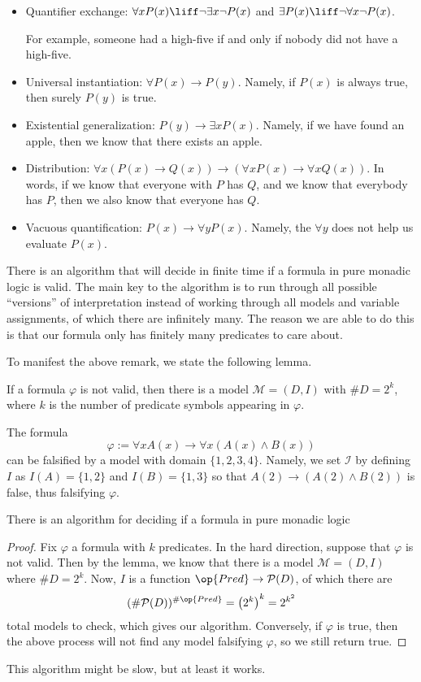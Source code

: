 \documentclass[../notes.tex]{subfiles}
\begin{document}
\begin{itemize}
	\item Quantifier exchange: $\forall xP(x)\liff\lnot\exists x\lnot P(x)$ and $\exists P(x)\liff\lnot\forall x\lnot P(x)$.

	For example, someone had a high-five if and only if nobody did not have a high-five.

	\item Universal instantiation: $\forall P(x)\to P(y)$. Namely, if $P(x)$ is always true, then surely $P(y)$ is true.

	\item Existential generalization: $P(y)\to\exists xP(x)$. Namely, if we have found an apple, then we know that there exists an apple.

	\item Distribution: $\forall x(P(x)\to Q(x))\to(\forall xP(x)\to\forall xQ(x))$. In words, if we know that everyone with $P$ has $Q$, and we know that everybody has $P$, then we also know that everyone has $Q$.

	\item Vacuous quantification: $P(x)\to\forall yP(x)$. Namely, the $\forall y$ does not help us evaluate $P(x)$.
\end{itemize}
\begin{remark}
	There is an algorithm that will decide in finite time if a formula in pure monadic logic is valid. The main key to the algorithm is to run through all possible ``versions'' of interpretation instead of working through all models and variable assignments, of which there are infinitely many. The reason we are able to do this is that our formula only has finitely many predicates to care about.
\end{remark}
To manifest the above remark, we state the following lemma.
\begin{lemma}
	If a formula $\varphi$ is not valid, then there is a model $\mathcal M=(D,I)$ with $\#D=2^k$, where $k$ is the number of predicate symbols appearing in $\varphi$.
\end{lemma}
\begin{example}
	The formula
	\[\varphi:=\forall xA(x)\to\forall x(A(x)\land B(x))\]
	can be falsified by a model with domain $\{1,2,3,4\}$. Namely, we set $\mathcal I$ by defining $I$ as $I(A)=\{1,2\}$ and $I(B)=\{1,3\}$ so that $A(2)\to(A(2)\land B(2))$ is false, thus falsifying $\varphi$.
\end{example}
\begin{corollary}
	There is an algorithm for deciding if a formula in pure monadic logic
\end{corollary}
\begin{proof}
	Fix $\varphi$ a formula with $k$ predicates. In the hard direction, suppose that $\varphi$ is not valid. Then by the lemma, we know that there is a model $\mathcal M=(D,I)$ where $\#D=2^k$. Now, $I$ is a function $\op{Pred}\to\mathcal P(D)$, of which there are
	\[(\#\mathcal P(D))^{\#\op{Pred}}=\left(2^k\right)^k=2^{k^2}\]
	total models to check, which gives our algorithm. Conversely, if $\varphi$ is true, then the above process will not find any model falsifying $\varphi$, so we still return true.
\end{proof}
This algorithm might be slow, but at least it works.
\end{document}
